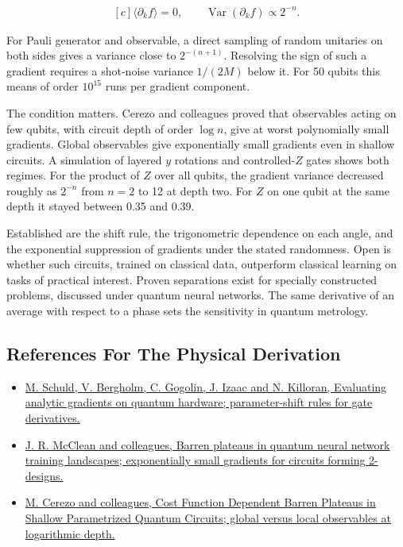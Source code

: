 \documentclass[11pt,oneside]{book}
\newenvironment{centeredalign}{\[\begin{gathered}[c]}{\end{gathered}\]}
\begin{document}
\begin{centeredalign}
\langle\partial_kf\rangle=0,\qquad \operatorname{Var}(\partial_kf)\propto2^{-n}.
\end{centeredalign}

For Pauli generator and observable, a direct sampling of random unitaries on both sides gives a variance close to \(2^{-(n+1)}\). Resolving the sign of such a gradient requires a shot-noise variance \(1/(2M)\) below it. For 50 qubits this means of order \(10^{15}\) runs per gradient component.

The condition matters. Cerezo and colleagues proved that observables acting on few qubits, with circuit depth of order \(\log n\), give at worst polynomially small gradients. Global observables give exponentially small gradients even in shallow circuits. A simulation of layered \(y\) rotations and controlled-\(Z\) gates shows both regimes. For the product of \(Z\) over all qubits, the gradient variance decreased roughly as \(2^{-n}\) from \(n=2\) to 12 at depth two. For \(Z\) on one qubit at the same depth it stayed between 0.35 and 0.39.

Established are the shift rule, the trigonometric dependence on each angle, and the exponential suppression of gradients under the stated randomness. Open is whether such circuits, trained on classical data, outperform classical learning on tasks of practical interest. Proven separations exist for specially constructed problems, discussed under quantum neural networks. The same derivative of an average with respect to a phase sets the sensitivity in quantum metrology.

\subsection*{References For The Physical Derivation}
\begin{itemize}
\item \href{https://arxiv.org/abs/1811.11184}{M. Schuld, V. Bergholm, C. Gogolin, J. Izaac and N. Killoran, Evaluating analytic gradients on quantum hardware; parameter-shift rules for gate derivatives.}
\item \href{https://arxiv.org/abs/1803.11173}{J. R. McClean and colleagues, Barren plateaus in quantum neural network training landscapes; exponentially small gradients for circuits forming 2-designs.}
\item \href{https://arxiv.org/abs/2001.00550}{M. Cerezo and colleagues, Cost Function Dependent Barren Plateaus in Shallow Parametrized Quantum Circuits; global versus local observables at logarithmic depth.}
\end{itemize}
\end{document}
